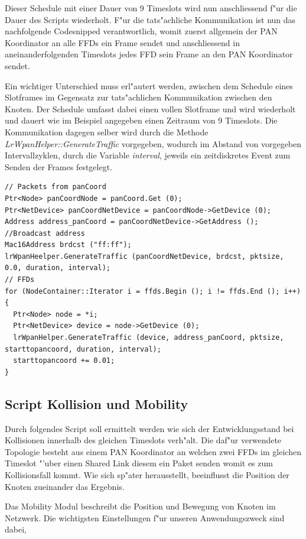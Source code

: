Dieser Schedule mit einer Dauer von 9 Timeslots wird nun anschliessend f"ur die
Dauer des Scripts wiederholt. F"ur die tats"achliche Kommunikation ist nun das nachfolgende
Codesnipped verantwortlich, womit zuerst allgemein der PAN Koordinator an alle FFDs
ein Frame sendet und anschliessend in aneinanderfolgenden Timeslots jedes FFD sein
Frame an den PAN Koordinator sendet.

Ein wichtiger Unterschied muss erl"autert werden, zwischen dem Schedule eines Slotframes
im Gegensatz zur tats"achlichen Kommunikation zwischen den Knoten. Der Schedule umfasst
dabei einen vollen Slotframe und wird wiederholt und dauert wie im Beispiel angegeben
einen Zeitraum von 9 Timeslots. Die Kommunikation dagegen selber wird durch die
Methode \textit{LrWpanHelper::GenerateTraffic} vorgegeben, wodurch im Abstand von
vorgegeben Intervallzyklen, durch die Variable \textit{interval},
jeweils ein zeitdiskretes Event zum Senden der Frames festgelegt.


\begin{lstlisting}[frame=single]
// Packets from panCoord
Ptr<Node> panCoordNode = panCoord.Get (0);
Ptr<NetDevice> panCoordNetDevice = panCoordNode->GetDevice (0);
Address address_panCoord = panCoordNetDevice->GetAddress ();
//Broadcast address
Mac16Address brdcst ("ff:ff");
lrWpanHeelper.GenerateTraffic (panCoordNetDevice, brdcst, pktsize, 0.0, duration, interval);
// FFDs
for (NodeContainer::Iterator i = ffds.Begin (); i != ffds.End (); i++)
{
  Ptr<Node> node = *i;
  Ptr<NetDevice> device = node->GetDevice (0);
  lrWpanHelper.GenerateTraffic (device, address_panCoord, pktsize, starttopancoord, duration, interval);
  starttopancoord += 0.01;
}
\end{lstlisting}

\clearpage
\subsection{Script Kollision und Mobility}

Durch folgendes Script soll ermittelt werden wie sich der Entwicklungsstand bei
Kollisionen innerhalb des gleichen Timeslots verh"alt. Die daf"ur verwendete Topologie
besteht aus einem PAN Koordinator an welchen zwei FFDs im gleichen Timeslot "'uber
einen Shared Link diesem ein Paket senden womit es zum Kollisionsfall kommt.
Wie sich sp"ater herausstellt, beeinflusst die Position der Knoten zueinander das
Ergebnis.

Das Mobility Modul beschreibt die Position und Bewegung von Knoten im Netzwerk.
Die wichtigsten Einstellungen f"ur unseren Anwendungszweck sind dabei,

